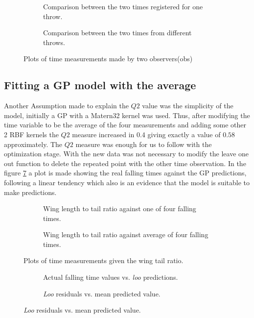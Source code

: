 \begin{figure}
	\begin{subfigure}[h]{.5\linewidth}
		
		\caption{Comparison between the two times registered for one throw.}
		\label{fig_EX1_EX1}
	\end{subfigure}
	\begin{subfigure}[h]{.5\linewidth}
		
		\caption{Comparison between the two times from different throws.}
		\label{fig_EX1_EX2}
	\end{subfigure}
	\caption{Plots of time measurements made by two observers(obs)}
\end{figure}

\subsection{Fitting a GP model with the average}

Another Assumption made to explain the $Q2$ value was the simplicity of the
model, initially a GP with a Matern32 kernel was used. Thus, after modifying
the time variable to be the average of the four measurements and adding some
other 2 RBF kernels the $Q2$ measure increased in 0.4 giving exactly a value of
$0.58$ approximately. The $Q2$ measure was enough for us to follow with the
optimization stage. With the new data was not necessary to modify the leave one
out function to delete the repeated point with the other time observation. In
the figure \ref{mloo_vs_real} a plot is made showing the real falling times
against the GP predictions, following a linear tendency which also is an
evidence that the model is suitable to make predictions.


\begin{figure}
	\begin{subfigure}[h]{.5\linewidth}
		
		\caption{Wing length to tail ratio against one of four falling times.}
		\label{fig_wtr_vs_obs2}
	\end{subfigure}
	\begin{subfigure}[h]{.5\linewidth}
		
		\caption{Wing length to tail ratio against average of four falling times.}
		\label{fig_wtr_vs_avg4}
	\end{subfigure}
	\caption{Plots of time measurements given the wing tail ratio.}
\end{figure}

\begin{figure}[h]
	\begin{subfigure}{.5\linewidth}
		\centering
		\scalebox{0.8}{}
		\caption{Actual falling time values vs. \emph{loo} predictions.}
		\label{mloo_vs_real}
	\end{subfigure}
	\begin{subfigure}{.5\linewidth}
		\centering
		\scalebox{0.8}{}
		\caption{\emph{Loo} residuals vs. mean predicted value.}
		\label{mlooresiduals_vs_real}
	\end{subfigure}
\end{figure}

